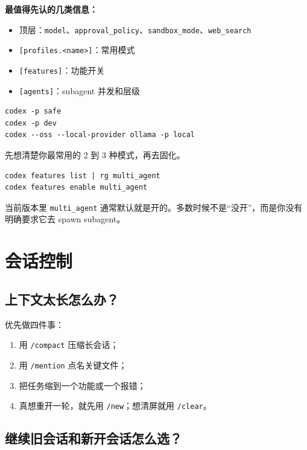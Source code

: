 \documentclass[UTF8,a4paper,11pt]{ctexart}
\begin{document}
\textbf{最值得先认的几类信息：}
\begin{itemize}
  \item 顶层：\texttt{model}、\texttt{approval\_policy}、\texttt{sandbox\_mode}、\texttt{web\_search}
  \item \texttt{[profiles.<name>]}：常用模式
  \item \texttt{[features]}：功能开关
  \item \texttt{[agents]}：subagent 并发和层级
\end{itemize}

\begin{lstlisting}[style=cli]
codex -p safe
codex -p dev
codex --oss --local-provider ollama -p local
\end{lstlisting}

先想清楚你最常用的 2 到 3 种模式，再去固化。

\begin{lstlisting}[style=cli]
codex features list | rg multi_agent
codex features enable multi_agent
\end{lstlisting}

\begin{tipbox}
当前版本里 \texttt{multi\_agent} 通常默认就是开的。多数时候不是“没开”，而是你没有明确要求它去 spawn subagent。
\end{tipbox}

\section{会话控制}

\subsection{上下文太长怎么办？}

优先做四件事：
\begin{enumerate}
  \item 用 \texttt{/compact} 压缩长会话；
  \item 用 \texttt{/mention} 点名关键文件；
  \item 把任务缩到一个功能或一个报错；
  \item 真想重开一轮，就先用 \texttt{/new}；想清屏就用 \texttt{/clear}。
\end{enumerate}

\subsection{继续旧会话和新开会话怎么选？}
\end{document}
